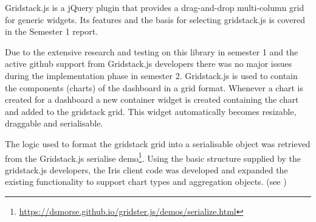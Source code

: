 \documentclass[12pt,a4paper,titlepage]{report}
\begin{document}
Gridstack.js is a jQuery plugin that provides a drag-and-drop multi-column grid for generic widgets. 
Its features and the basis for selecting gridstack.js is covered in the Semester 1 report.  
 
Due to the extensive research and testing on this library in semester 1 and the active github support from Gridstack.js developers there was no major issues during the implementation phase in semester 2. Gridstack.js is used to contain the components (charts) of the dashboard in a grid format. Whenever a chart is created for a dashboard a new container widget is created containing the chart and added to the gridstack grid. This widget automatically becomes resizable, draggable and serialisable.

The logic used to format the gridstack grid into a serialisable object was retrieved from the Gridstack.js serialise demo\footnote{\url{https://dsmorse.github.io/gridster.js/demos/serialize.html}}. Using the basic structure supplied by the gridstack.js developers, the Iris client code was developed and expanded the existing functionality to support chart types and aggregation objects. (see )
\end{document}
